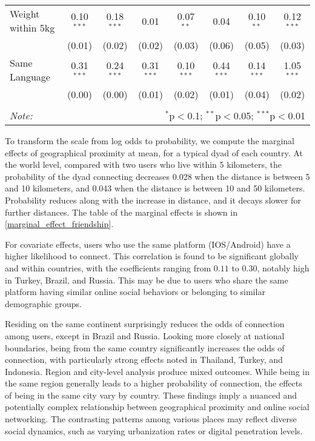 \begin{table}[!htbp]
\begin{tabular}{lccccccc}
    Weight within 5kg & 0.10$^{***}$ & 0.18$^{***}$ & 0.01 & 0.07$^{**}$ & 0.04 & 0.10$^{**}$ & 0.12$^{***}$ \\
    & (0.01) & (0.02) & (0.02) & (0.03) & (0.06) & (0.05) & (0.03) \\
    Same Language & 0.31$^{***}$ & 0.24$^{***}$ & 0.31$^{***}$ & 0.10$^{***}$ & 0.44$^{***}$ & 0.14$^{***}$ & 1.05$^{***}$ \\
    & (0.00) & (0.00) & (0.01) & (0.02) & (0.01) & (0.04) & (0.02) \\
\hline \hline \\[-1.8ex]
\textit{Note:}  & \multicolumn{7}{r}{$^{*}$p$<$0.1; $^{**}$p$<$0.05; $^{***}$p$<$0.01} \\
\end{tabular}
\end{table}

To transform the scale from log odds to probability, we compute the marginal effects of geographical proximity at mean, for a typical dyad of each country. At the world level, compared with two users who live within 5 kilometers, the probability of the dyad connecting decreases 0.028 when the distance is between 5 and 10 kilometers, and 0.043 when the distance is between 10 and 50 kilometers. Probability reduces along with the increase in distance, and it decays slower for further distances. The table of the marginal effects is shown in \ref{marginal_effect_friendship}.

For covariate effects, users who use the same platform (IOS/Android) have a higher likelihood to connect. This correlation is found to be significant globally and within countries, with the coefficients ranging from $0.11$ to $0.30$, notably high in Turkey, Brazil, and Russia. This may be due to users who share the same platform having similar online social behaviors or belonging to similar demographic groups.

Residing on the same continent surprisingly reduces the odds of connection among users, except in Brazil and Russia. Looking more closely at national boundaries, being from the same country significantly increases the odds of connection, with particularly strong effects noted in Thailand, Turkey, and Indonesia. Region and city-level analysis produce mixed outcomes. While being in the same region generally leads to a higher probability of connection, the effects of being in the same city vary by country. These findings imply a nuanced and potentially complex relationship between geographical proximity and online social networking. The contrasting patterns among various places may reflect diverse social dynamics, such as varying urbanization rates or digital penetration levels.

